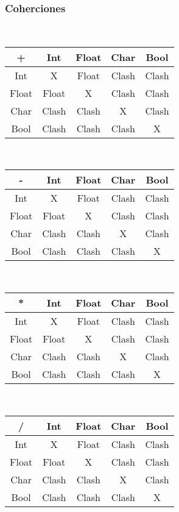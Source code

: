 \documentclass[12pt, spanish]{report}
\begin{document}
\subsubsection{Coherciones}
\\
\begin{tabular}{|c||cccc|}
	\hline
+      &  Int  & Float & Char  & Bool  \\
	\hline \hline
Int    &   X   & Float & Clash & Clash \\
Float  & Float &   X   & Clash & Clash \\
Char   & Clash & Clash &   X   & Clash \\
Bool   & Clash & Clash & Clash &   X   \\
	\hline
\end{tabular}
\\
\begin{tabular}{|c||cccc|}
	\hline
-      &  Int  & Float & Char  & Bool  \\
	\hline \hline
Int    &   X   & Float & Clash & Clash \\
Float  & Float &   X   & Clash & Clash \\
Char   & Clash & Clash &   X   & Clash \\
Bool   & Clash & Clash & Clash &   X   \\
	\hline
\end{tabular}
\\
\begin{tabular}{|c||cccc|}
	\hline
*      &  Int  & Float & Char  & Bool  \\
	\hline \hline
Int    &   X   & Float & Clash & Clash \\
Float  & Float &   X   & Clash & Clash \\
Char   & Clash & Clash &   X   & Clash \\
Bool   & Clash & Clash & Clash &   X   \\
	\hline
\end{tabular}
\\
\begin{tabular}{|c||cccc|}
	\hline
/      &  Int  & Float & Char  & Bool  \\
	\hline \hline
Int    &   X   & Float & Clash & Clash \\
Float  & Float &   X   & Clash & Clash \\
Char   & Clash & Clash &   X   & Clash \\
Bool   & Clash & Clash & Clash &   X   \\
	\hline
\end{tabular}
\end{document}
